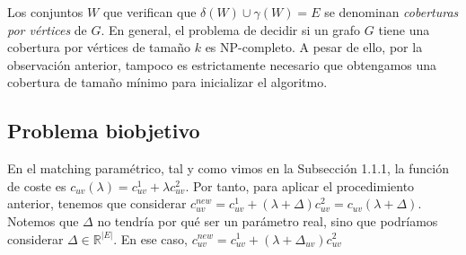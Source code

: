 \documentclass[twoside,a4paper,openright,12pt,tikz]{book}
\newcommand{\R}{\mathbb{R}}
\begin{document}
Los conjuntos $W$ que verifican que $\delta(W)\cup\gamma(W)=E$ se denominan \textit{coberturas por vértices} de $G$. En general, el problema de decidir si un grafo $G$ tiene una cobertura por vértices de tamaño $k$ es NP-completo. A pesar de ello, por la observación anterior, tampoco es estrictamente necesario que obtengamos una cobertura de tamaño mínimo para inicializar el algoritmo. 

\subsection{Problema biobjetivo}
En el matching paramétrico, tal y como vimos en la Subsección 1.1.1, la función de coste es $c_{uv}(\lambda) = c^1_{uv} + \lambda c^2_{uv}$. Por tanto, para aplicar el procedimiento anterior, tenemos que considerar $c_{uv}^{new} = c^1_{uv} + (\lambda + \Delta) c^2_{uv}= c_{uv}(\lambda+\Delta)$. Notemos que $\Delta$ no tendría por qué ser un parámetro real, sino que podríamos considerar $\Delta \in \R^{|E|}$. En ese caso, $c_{uv}^{new} = c^1_{uv} + (\lambda + \Delta_{uv}) c^2_{uv}$ 
\end{document}
